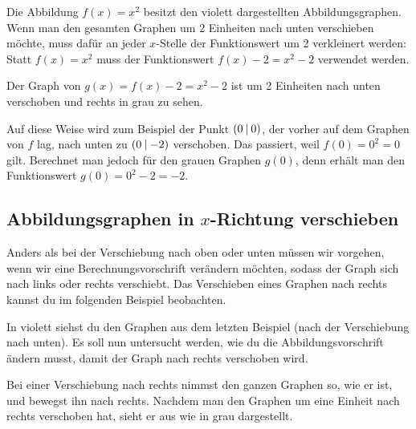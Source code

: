 \documentclass[../../main.tex]{subfiles}
\begin{document}
\begin{example}

    Die Abbildung $f(x)=x^2$ besitzt den violett dargestellten Abbildungsgraphen. Wenn man den gesamten Graphen um 2 Einheiten nach unten verschieben möchte, muss dafür an jeder $x$-Stelle der Funktionswert um 2 verkleinert werden: Statt $f(x)=x^2$ muss der Funktionswert $f(x)-2=x^2-2$ verwendet werden. 
    
    Der Graph von $g(x)=f(x)-2=x^2-2$ ist um 2 Einheiten nach unten verschoben und rechts in grau zu sehen.
    
    Auf diese Weise wird zum Beispiel der Punkt $\left(0 \:\middle|\: 0\right)$, der vorher auf dem Graphen von $f$ lag, nach unten zu $\left(0 \:\middle|\: -2\right)$ verschoben. Das passiert, weil $f(0)=0^2=0$ gilt. Berechnet man jedoch für den grauen Graphen $g(0)$, denn erhält man den Funktionswert \mbox{$g(0)=0^2-2=-2$}.
\end{example}

\subsection{Abbildungsgraphen in $x$-Richtung verschieben}
\label{sec:abbildungen_verschieben_x}

Anders als bei der Verschiebung nach oben oder unten müssen wir vorgehen, wenn wir eine Berechnungsvorschrift verändern möchten, sodass der Graph sich nach links oder rechts verschiebt. Das Verschieben eines Graphen nach rechts kannst du im folgenden Beispiel beobachten.

\begin{example}
    
    In violett siehst du den Graphen aus dem letzten Beispiel (nach der Verschiebung nach unten). Es soll nun untersucht werden, wie du die Abbildungsvorschrift ändern musst, damit der Graph nach rechts verschoben wird. 
    
    Bei einer Verschiebung nach rechts nimmst den ganzen Graphen so, wie er ist, und bewegst ihn nach rechts. Nachdem man den Graphen um eine Einheit nach rechts verschoben hat, sieht er aus wie in grau dargestellt.
\end{example}
\end{document}
